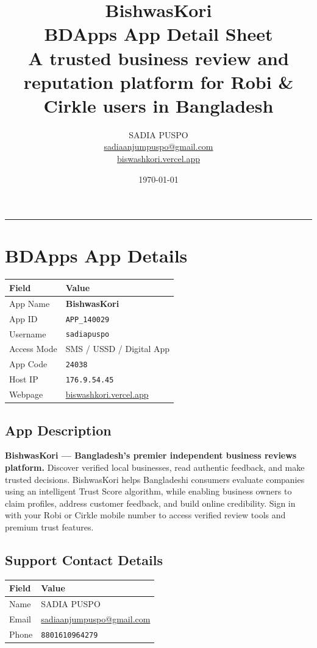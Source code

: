 \documentclass[11pt,a4paper]{article}
\title{\textbf{\Huge BishwasKori}\\[0.4em]
       \large BDApps App Detail Sheet\\[0.2em]
       \normalsize A trusted business review and reputation platform for Robi \& Cirkle users in Bangladesh}
\author{SADIA PUSPO\\
        \href{mailto:sadiaanjumpuspo@gmail.com}{sadiaanjumpuspo@gmail.com}\\
        \href{https://biswashkori.vercel.app/}{biswashkori.vercel.app}}
\date{\today}
\begin{document}
\maketitle
\thispagestyle{empty}

\vspace{-1em}
\hrule
\vspace{1.5em}

\section*{BDApps App Details}

\begin{tabularx}{\textwidth}{@{}lX@{}}
\toprule
\textbf{Field} & \textbf{Value} \\
\midrule
App Name       & \textbf{BishwasKori} \\
App ID         & \texttt{APP\_140029} \\
Username       & \texttt{sadiapuspo} \\
Access Mode    & SMS / USSD / Digital App \\
App Code       & \texttt{24038} \\
Host IP        & \texttt{176.9.54.45} \\
Webpage        & \href{https://biswashkori.vercel.app/}{biswashkori.vercel.app} \\
\bottomrule
\end{tabularx}

\vspace{1em}

\subsection*{App Description}
\textbf{BishwasKori --- Bangladesh's premier independent business reviews platform.}
Discover verified local businesses, read authentic feedback, and make trusted decisions. BishwasKori helps Bangladeshi consumers evaluate companies using an intelligent Trust Score algorithm, while enabling business owners to claim profiles, address customer feedback, and build online credibility. Sign in with your Robi or Cirkle mobile number to access verified review tools and premium trust features.

\subsection*{Support Contact Details}
\begin{tabularx}{\textwidth}{@{}lX@{}}
\toprule
\textbf{Field} & \textbf{Value} \\
\midrule
Name           & SADIA PUSPO \\
Email          & \href{mailto:sadiaanjumpuspo@gmail.com}{sadiaanjumpuspo@gmail.com} \\
Phone          & \texttt{8801610964279} \\
\bottomrule
\end{tabularx}
\end{document}
